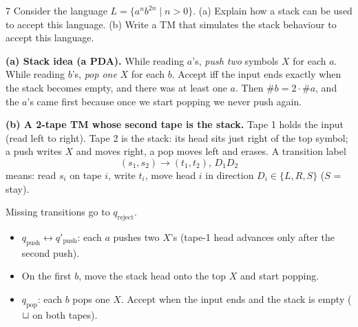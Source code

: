 \begin{question}{7}
Consider the language $L=\{a^nb^{2n}\mid n>0\}$.
(a) Explain how a stack can be used to accept this language.
(b) Write a TM that simulates the stack behaviour to accept this language.
\end{question}
\begin{soln}
\textbf{(a) Stack idea (a PDA).} While reading $a$'s, \emph{push two} symbols $X$ for each $a$. While reading $b$'s, \emph{pop one} $X$ for each $b$. Accept iff the input ends exactly when the stack becomes empty, and there was at least one $a$. Then $\#b=2\cdot\#a$, and the $a$'s came first because once we start popping we never push again.

\textbf{(b) A 2-tape TM whose second tape is the stack.} Tape 1 holds the input (read left to right). Tape 2 is the stack: its head sits just right of the top symbol; a push writes $X$ and moves right, a pop moves left and erases. A transition label
\[
(s_1,s_2)\to(t_1,t_2),\,D_1D_2
\]
means: read $s_i$ on tape $i$, write $t_i$, move head $i$ in direction $D_i\in\{L,R,S\}$ ($S$ = stay).

\begin{center}

{\footnotesize Missing transitions go to $q_{\mathrm{reject}}$.}
\end{center}

\begin{itemize}
\item $q_{\mathrm{push}}\leftrightarrow q'_{\mathrm{push}}$: each $a$ pushes two $X$'s (tape-1 head advances only after the second push).
\item On the first $b$, move the stack head onto the top $X$ and start popping.
\item $q_{\mathrm{pop}}$: each $b$ pops one $X$. Accept when the input ends and the stack is empty ($\sqcup$ on both tapes).
\end{itemize}


\end{soln}
